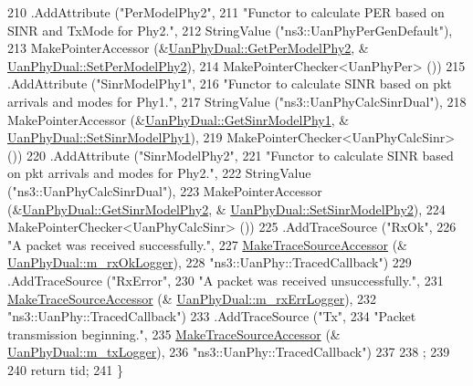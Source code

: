 \begin{DoxyCode}
210     .AddAttribute (\textcolor{stringliteral}{"PerModelPhy2"},
211                    \textcolor{stringliteral}{"Functor to calculate PER based on SINR and TxMode for Phy2."},
212                    StringValue (\textcolor{stringliteral}{"ns3::UanPhyPerGenDefault"}),
213                    MakePointerAccessor (&\hyperlink{classns3_1_1UanPhyDual_a69fa7ff8b092615772f94f5d2ea15258}{UanPhyDual::GetPerModelPhy2}, &
      \hyperlink{classns3_1_1UanPhyDual_a7437d8ef31a521ae4763ff7906c3cf1a}{UanPhyDual::SetPerModelPhy2}),
214                    MakePointerChecker<UanPhyPer> ())
215     .AddAttribute (\textcolor{stringliteral}{"SinrModelPhy1"},
216                    \textcolor{stringliteral}{"Functor to calculate SINR based on pkt arrivals and modes for Phy1."},
217                    StringValue (\textcolor{stringliteral}{"ns3::UanPhyCalcSinrDual"}),
218                    MakePointerAccessor (&\hyperlink{classns3_1_1UanPhyDual_a6be547eee609c38cc68013bcbae4609e}{UanPhyDual::GetSinrModelPhy1}, &
      \hyperlink{classns3_1_1UanPhyDual_ae88698bf1f37d31084bc7ba089cc4d79}{UanPhyDual::SetSinrModelPhy1}),
219                    MakePointerChecker<UanPhyCalcSinr> ())
220     .AddAttribute (\textcolor{stringliteral}{"SinrModelPhy2"},
221                    \textcolor{stringliteral}{"Functor to calculate SINR based on pkt arrivals and modes for Phy2."},
222                    StringValue (\textcolor{stringliteral}{"ns3::UanPhyCalcSinrDual"}),
223                    MakePointerAccessor (&\hyperlink{classns3_1_1UanPhyDual_a9494e05c0bd985c47788dce81f256e41}{UanPhyDual::GetSinrModelPhy2}, &
      \hyperlink{classns3_1_1UanPhyDual_a7ace7148b8546c5981920280df52237e}{UanPhyDual::SetSinrModelPhy2}),
224                    MakePointerChecker<UanPhyCalcSinr> ())
225     .AddTraceSource (\textcolor{stringliteral}{"RxOk"},
226                      \textcolor{stringliteral}{"A packet was received successfully."},
227                      \hyperlink{group__tracing_gab21a770b9855af4e8f69f7531ea4a6b0}{MakeTraceSourceAccessor} (&
      \hyperlink{classns3_1_1UanPhyDual_adfdf3cb0199f848fdc9ad75474d0ab0e}{UanPhyDual::m\_rxOkLogger}),
228                      \textcolor{stringliteral}{"ns3::UanPhy::TracedCallback"})
229     .AddTraceSource (\textcolor{stringliteral}{"RxError"},
230                      \textcolor{stringliteral}{"A packet was received unsuccessfully."},
231                      \hyperlink{group__tracing_gab21a770b9855af4e8f69f7531ea4a6b0}{MakeTraceSourceAccessor} (&
      \hyperlink{classns3_1_1UanPhyDual_a2933108d3c6337b137ff15ad4fc201c6}{UanPhyDual::m\_rxErrLogger}),
232                      \textcolor{stringliteral}{"ns3::UanPhy::TracedCallback"})
233     .AddTraceSource (\textcolor{stringliteral}{"Tx"},
234                      \textcolor{stringliteral}{"Packet transmission beginning."},
235                      \hyperlink{group__tracing_gab21a770b9855af4e8f69f7531ea4a6b0}{MakeTraceSourceAccessor} (&
      \hyperlink{classns3_1_1UanPhyDual_a455f735d55ccdaaa2b5d593b22ea33ec}{UanPhyDual::m\_txLogger}),
236                      \textcolor{stringliteral}{"ns3::UanPhy::TracedCallback"})
237 
238   ;
239 
240   \textcolor{keywordflow}{return} tid;
241 \}
\end{DoxyCode}


